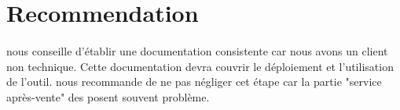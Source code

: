 \documentclass [a4paper] {article}
\begin{document}
\section{Recommendation}
\paragraph*{}
\nomTuteurQualite{} nous conseille d'établir une documentation consistente car nous avons un client non technique. Cette documentation devra couvrir le déploiement et l'utilisation de l'outil.
\nomTuteurQualite{} nous recommande de ne pas négliger cet étape car la partie "service après-vente" des \PIC{} posent souvent problème.
\end{document}
